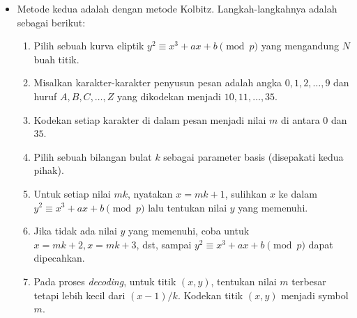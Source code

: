 \documentclass{article}
\begin{document}

\begin{itemize}
    \item Metode kedua adalah dengan metode Kolbitz. Langkah-langkahnya adalah sebagai berikut:
    \begin{enumerate}
        \item Pilih sebuah kurva eliptik $y^2 \equiv x^3 + ax + b \pmod{p}$ yang mengandung $N$ buah titik.
        \item Misalkan karakter-karakter penyusun pesan adalah angka $0, 1, 2, \dots, 9$ dan huruf $A, B, C, \dots, Z$ yang dikodekan menjadi $10, 11, \dots, 35$.
        \item Kodekan setiap karakter di dalam pesan menjadi nilai $m$ di antara $0$ dan $35$.
        \item Pilih sebuah bilangan bulat $k$ sebagai parameter basis (disepakati kedua pihak).
        \item Untuk setiap nilai $mk$, nyatakan $x = mk + 1$, sulihkan $x$ ke dalam $y^2 \equiv x^3 + ax + b \pmod{p}$ lalu tentukan nilai $y$ yang memenuhi.
        \item Jika tidak ada nilai $y$ yang memenuhi, coba untuk $x = mk + 2, x = mk + 3$, dst, sampai $y^2 \equiv x^3 + ax + b \pmod{p}$ dapat dipecahkan.
        \item Pada proses \textit{decoding}, untuk titik $(x, y)$, tentukan nilai $m$ terbesar tetapi lebih kecil dari $(x - 1)/k$. Kodekan titik $(x, y)$ menjadi symbol $m$.
    \end{enumerate}
\end{itemize}
\end{document}
